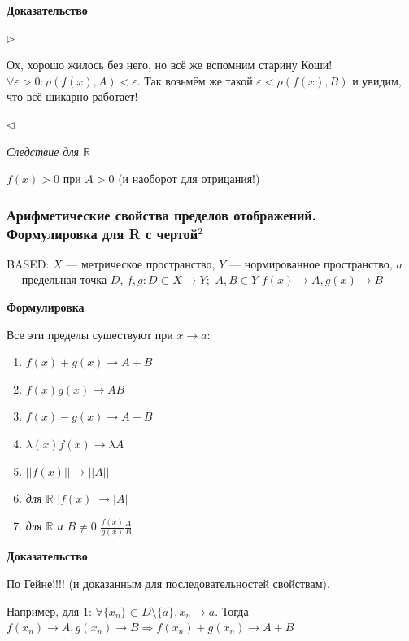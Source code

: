 \documentclass{article}
\def\dbl{\,\,}
\begin{document}
\textbf{Доказательство}

$\rhd$

Ох, хорошо жилось без него, но всё же вспомним старину Коши! $\forall \varepsilon > 0 : \rho(f(x), A) < \varepsilon$. Так возьмём же такой $\varepsilon < \rho(f(x), B)$ и увидим, что всё шикарно работает! 

$\lhd$

\textit{Следствие для $\mathbb{R}$} 

$f(x) > 0$ при $A > 0$ (и наоборот для отрицания!)

\subsubsection{Арифметические свойства пределов отображений.\texorpdfstring{\\}{} Формулировка для R с чертой\texorpdfstring{$^2$}{}}

\textsc{BASED:} $X$ --- метрическое пространство, $Y$ --- нормированное пространство, $a$ --- предельная точка $D$, $f, g: D \subset X \rightarrow Y; \dbl A, B \in Y \dbl f(x) \rightarrow A, g(x) \rightarrow B$

\textbf{Формулировка}

Все эти пределы существуют при $x \rightarrow a$: 

\begin{enumerate}
    \item $f(x) + g(x) \rightarrow A + B$
    \item $f(x)g(x) \rightarrow AB$
    \item $f(x) - g(x) \rightarrow A - B$
    \item $\lambda(x)f(x) \rightarrow \lambda A$
    \item $||f(x)|| \rightarrow ||A||$
    \item \textit{для $\mathbb{R}$} $|f(x)| \rightarrow |A|$
    \item \textit{для $\mathbb{R}$ и $B \neq 0$} $\frac{f(x)}{g(x)} \frac{A}{B}$
\end{enumerate}

\textbf{Доказательство}

\Smiley\Smiley\Smiley\Smiley

По Гейне!!!! (и доказанным для последовательностей свойствам).

Например, для 1: $\forall \{x_n\} \subset D \setminus \{a\}, x_n \rightarrow a$. Тогда $f(x_n) \rightarrow A, g(x_n) \rightarrow B \Rightarrow f(x_n) + g(x_n) \rightarrow A + B$
\end{document}
